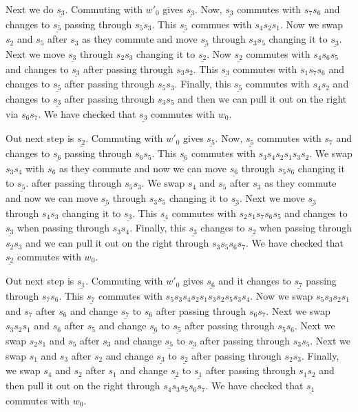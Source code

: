 \documentclass[a4paper]{amsart}
\begin{document}
Next we do $\underline{s_{3}}$. Commuting with 
$w'_0$ gives $\underline{s_{3}}$. Now, $\underline{s_{3}}$
commutes with $s_7 s_6$ and changes to  $\underline{s_{5}}$
passing through $s_5 s_3$.  This $\underline{s_{5}}$ commues
with $s_4 s_2 s_1$. Now we swap $s_2$ and $s_5$ after $s_3$
as they commute and move $\underline{s_{5}}$ through 
$s_3s_5$ changing it to $\underline{s_{3}}$. Next we move
$\underline{s_{3}}$ through $s_2 s_3$ changing it to 
$\underline{s_{2}}$. Now $\underline{s_{2}}$ commutes with
$s_4 s_6 s_5$ and changes to $\underline{s_{3}}$ after
passing through $s_3 s_2$. This $\underline{s_{3}}$ commutes
with $s_1 s_7 s_6$ and changes to $\underline{s_{5}}$
after passing through $s_5 s_3$. Finally, this 
$\underline{s_{5}}$ commutes
with $s_4 s_2$ and changes to $\underline{s_{3}}$
after passing through $s_3 s_5$ and then we can pull
it out on the right via $s_6 s_7$. We have checked that 
$\underline{s_{3}}$ commutes with $w_0$.

Out next step is $\underline{s_{2}}$. Commuting with 
$w'_0$ gives $\underline{s_{5}}$. Now, $\underline{s_{5}}$
commutes with $s_7 $ and changes to  $\underline{s_{6}}$
passing through $s_6 s_5$.  This $\underline{s_{6}}$ commutes
with $s_3 s_4 s_2 s_1 s_3 s_2$. We swap $s_3 s_4$ with 
$s_6$ as they commute and now we can move $\underline{s_{6}}$
through $s_5 s_6$ changing it to $\underline{s_{5}}$.
after passing through $s_5 s_3$. We swap $s_4$ and $s_5$
after $s_3$ as they commute and now we can move 
$\underline{s_{5}}$ through $s_3 s_5$ changing it to
$\underline{s_{3}}$. Next we move $\underline{s_{3}}$
through $s_4 s_3$ changing it to $\underline{s_{3}}$.
This $\underline{s_{4}}$ commutes
with $s_2 s_1 s_7 s_6 s_5$ and changes to $\underline{s_{3}}$
when passing through $s_3 s_4$. Finally, this 
$\underline{s_{3}}$ changes to $\underline{s_{2}}$
when passing through $s_2 s_3$ and we can pull it out on
the right through $s_3 s_5 s_6 s_7$. We have checked that 
$\underline{s_{2}}$ commutes with $w_0$.

Out next step is $\underline{s_{1}}$.  Commuting with 
$w'_0$ gives $\underline{s_{6}}$ and it changes to 
$\underline{s_{7}}$ passing through $s_7 s_6$.
This $\underline{s_{7}}$ commutes with
$s_5 s_3 s_4 s_2 s_1 s_3 s_2 
s_5 s_3 s_4$. Now we swap $s_5 s_3 s_2 s_1$
and $s_7$ after $s_6$ and change
$\underline{s_{7}}$ to $\underline{s_{6}}$
after passing through $s_6 s_7$.
Next we swap $s_3 s_2 s_1$
and $s_6$ after $s_5$ and change
$\underline{s_{6}}$ to $\underline{s_{5}}$
after passing through $s_5 s_6$.
Next we swap $s_2 s_1$
and $s_5$ after $s_3$ and change
$\underline{s_{5}}$ to $\underline{s_{3}}$
after passing through $s_3 s_5$.
Next we swap $s_1$
and $s_3$ after $s_2$ and change
$\underline{s_{3}}$ to $\underline{s_{2}}$
after passing through $s_2 s_3$.
Finally,  we swap $s_4$
and $s_2$ after $s_1$ and change
$\underline{s_{2}}$ to $\underline{s_{1}}$
after passing through $s_1 s_2$ and then
pull it out on the right through $s_4 s_3 s_5 s_6 s_7$.
We have checked that 
$\underline{s_{1}}$ commutes with $w_0$.
\end{document}
